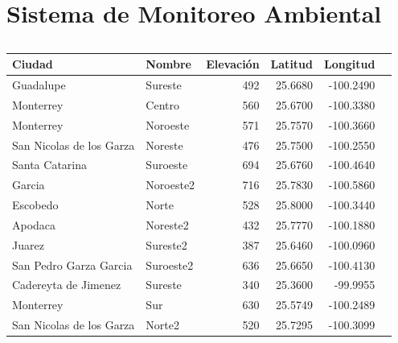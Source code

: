 \section{Sistema de Monitoreo Ambiental}

\begin{table}[H]
	\centering
	\begin{tabular}{llrrrr} \hline
		\textbf{Ciudad}          & \textbf{Nombre} & \textbf{Elevación} & \textbf{Latitud} & \textbf{Longitud} \\ \hline
		Guadalupe                & Sureste         & 492                & 25.6680          & -100.2490         \\
		Monterrey                & Centro          & 560                & 25.6700          & -100.3380         \\
		Monterrey                & Noroeste        & 571                & 25.7570          & -100.3660         \\
		San Nicolas de los Garza & Noreste         & 476                & 25.7500          & -100.2550         \\
		Santa Catarina           & Suroeste        & 694                & 25.6760          & -100.4640         \\
		Garcia                   & Noroeste2       & 716                & 25.7830          & -100.5860         \\
		Escobedo                 & Norte           & 528                & 25.8000          & -100.3440         \\
		Apodaca                  & Noreste2        & 432                & 25.7770          & -100.1880         \\
		Juarez                   & Sureste2        & 387                & 25.6460          & -100.0960         \\
		San Pedro Garza Garcia   & Suroeste2       & 636                & 25.6650          & -100.4130         \\
		Cadereyta de Jimenez     & Sureste         & 340                & 25.3600          & -99.9955          \\
		Monterrey                & Sur             & 630                & 25.5749          & -100.2489         \\
		San Nicolas de los Garza & Norte2          & 520                & 25.7295          & -100.3099         \\ \hline
	\end{tabular}
	\caption{}
	\label{table:stations_information}
\end{table}


